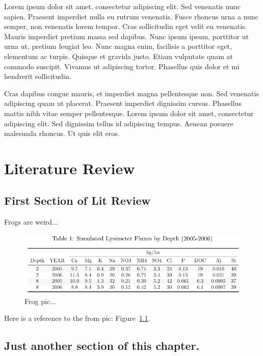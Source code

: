 \documentclass[double,12pt]{beavtex}
\begin{document}
Lorem ipsum dolor sit amet, consectetur adipiscing elit. Sed venenatis nunc sapien. Praesent imperdiet nulla eu rutrum venenatis. Fusce rhoncus urna a nunc semper, non venenatis lorem tempor. Cras sollicitudin eget velit eu venenatis. Mauris imperdiet pretium massa sed dapibus. Nunc ipsum ipsum, porttitor ut urna ut, pretium feugiat leo. Nunc magna enim, facilisis a porttitor eget, elementum ac turpis. Quisque et gravida justo. Etiam vulputate quam at commodo suscipit. Vivamus ut adipiscing tortor. Phasellus quis dolor et mi hendrerit sollicitudin. 

Cras dapibus congue mauris, et imperdiet magna pellentesque non. Sed venenatis adipiscing quam ut placerat. Praesent imperdiet dignissim cursus. Phasellus mattis nibh vitae semper pellentesque. Lorem ipsum dolor sit amet, consectetur adipiscing elit. Sed dignissim tellus id adipiscing tempus. Aenean posuere malesuada rhoncus. Ut quis elit eros.




\chapter{Literature Review}

\section{First Section of Lit Review}

Frogs are weird...

\begin{figure}[ht!]
\begin{center}
	\includegraphics[width=20cm]{Images/LN_SED/Base/test.pdf}
	\caption{Frog pic...}
	\label{fig:frog}
	\end{center}
\end{figure}


Here is a reference to the from pic: Figure~\ref{fig:frog}.

\section{Just another section of this chapter.}
\end{document}
